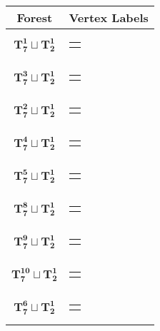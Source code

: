 \documentclass{article}
\begin{document}
\renewcommand{\arraystretch}{1.2} %
\setlength{\tabcolsep}{8pt} %
{\def\arraystretch{1}%
    \begin{longtable}{|c|c|} %
        \hline
        Forest & Vertex Labels \\
        \hline
            $\mathbf{T_{7}^{1}} \sqcup \mathbf{T_{2}^{1}}$ & \begin{tabular}{@{}l@{}} $(0,6,1,5,2,9,7)\sqcup(3,4)$ \end{tabular} \\ \hline
    $\mathbf{T_{7}^{3}} \sqcup \mathbf{T_{2}^{1}}$ & \begin{tabular}{@{}l@{}} $(9,2,5,1,6,0,3)\sqcup(8,7)$ \end{tabular} \\ \hline
    $\mathbf{T_{7}^{2}} \sqcup \mathbf{T_{2}^{1}}$ & \begin{tabular}{@{}l@{}} $(9,2,5,1,6,0,4)\sqcup(8,7)$ \end{tabular} \\ \hline
    $\mathbf{T_{7}^{4}} \sqcup \mathbf{T_{2}^{1}}$ & \begin{tabular}{@{}l@{}} $(5,1,4,2,9,6,7)\sqcup(10,11)$ \end{tabular} \\ \hline
    $\mathbf{T_{7}^{5}} \sqcup \mathbf{T_{2}^{1}}$ & \begin{tabular}{@{}l@{}} $(3,8,1,4,2,5,7)\sqcup(9,10)$ \end{tabular} \\ \hline
    $\mathbf{T_{7}^{8}} \sqcup \mathbf{T_{2}^{1}}$ & \begin{tabular}{@{}l@{}} $(7,8,1,6,0,4,3)\sqcup(9,11)$ \end{tabular} \\ \hline
    $\mathbf{T_{7}^{9}} \sqcup \mathbf{T_{2}^{1}}$ & \begin{tabular}{@{}l@{}} $(8,1,6,3,4,5,7)\sqcup(9,10)$ \end{tabular} \\ \hline
    $\mathbf{T_{7}^{10}} \sqcup \mathbf{T_{2}^{1}}$ & \begin{tabular}{@{}l@{}} $(6,1,5,3,8,4,7)\sqcup(9,10)$ \end{tabular} \\ \hline
    $\mathbf{T_{7}^{6}} \sqcup \mathbf{T_{2}^{1}}$ & \begin{tabular}{@{}l@{}} $(5,11,9,10,6,12,7)\sqcup(8,1)$ \end{tabular} \\ \hline

\end{longtable}}
\end{document}
